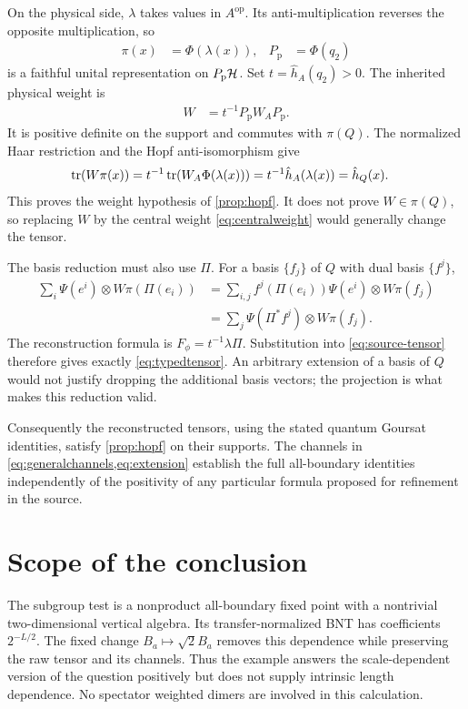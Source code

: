 \documentclass[aps,pra,reprint,nofootinbib,onecolumn]{revtex4-2}
\begin{document}
On the physical side, $\lambda$ takes values in $A^{\mathrm{op}}$.
Its anti-multiplication reverses the opposite multiplication, so
\begin{align}
	\pi(x)        & =\Phi(\lambda(x)),
	              &
	P_{\mathrm p} & =\Phi(q_2)
\end{align}
is a faithful unital representation on $P_{\mathrm p}\mathcal{H}$.
Set $t=\hat h_A(q_2)>0$. The inherited physical weight is
\begin{align}
	W & =t^{-1}P_{\mathrm p}W_AP_{\mathrm p}.
	\label{eq:inherited}
\end{align}
It is positive definite on the support and commutes with $\pi(Q)$.
The normalized Haar restriction and the Hopf anti-isomorphism give
\begin{align}
	\operatorname{tr}(W\pi(x))
	 & =t^{-1}\operatorname{tr}(W_A\Phi(\lambda(x)))
	=t^{-1}\hat h_A(\lambda(x))
	=\hat h_Q(x).
	\label{eq:reconstructedhaar}
\end{align}
This proves the weight hypothesis of \cref{prop:hopf}. It does not
prove $W\in\pi(Q)$, so replacing $W$ by the central weight
\cref{eq:centralweight} would generally change the tensor.

The basis reduction must also use $\Pi$. For a basis $\{f_j\}$ of
$Q$ with dual basis $\{f^j\}$,
\begin{align}
	\sum_i\Psi(e^i)\otimes W\pi(\Pi(e_i))
	 & =\sum_{i,j}f^j(\Pi(e_i))\Psi(e^i)\otimes W\pi(f_j)
	\\
	 & =\sum_j\Psi(\Pi^*f^j)\otimes W\pi(f_j).
	\label{eq:typedtensor}
\end{align}
The reconstruction formula is $F_\phi=t^{-1}\lambda\Pi$.
Substitution into \cref{eq:source-tensor} therefore gives exactly
\cref{eq:typedtensor}. An arbitrary extension of a basis of $Q$
would not justify dropping the additional basis vectors; the
projection is what makes this reduction valid.

Consequently the reconstructed tensors, using the stated quantum
Goursat identities, satisfy \cref{prop:hopf} on their supports.
The channels in \cref{eq:generalchannels,eq:extension} establish
the full all-boundary identities independently of the positivity
of any particular formula proposed for refinement in the source.

\section{Scope of the conclusion}

The subgroup test is a nonproduct all-boundary fixed point with a
nontrivial two-dimensional vertical algebra. Its transfer-normalized
BNT has coefficients $2^{-L/2}$. The fixed change
$B_a\mapsto\sqrt2 B_a$ removes this dependence while preserving the
raw tensor and its channels. Thus the example answers the
scale-dependent version of the question positively but does not
supply intrinsic length dependence. No spectator weighted dimers
are involved in this calculation.
\end{document}
